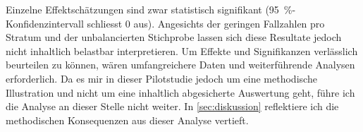 Einzelne Effektschätzungen sind zwar statistisch signifikant (95~\%-Konfidenzintervall schliesst 0 aus). Angesichts der geringen Fallzahlen pro Stratum und der unbalancierten Stichprobe lassen sich diese Resultate jedoch nicht inhaltlich belastbar interpretieren. Um Effekte und Signifikanzen verlässlich beurteilen zu können, wären umfangreichere Daten und weiterführende Analysen erforderlich. Da es mir in dieser Pilotstudie jedoch um eine methodische Illustration und nicht um eine inhaltlich abgesicherte Auswertung geht, führe ich die Analyse an dieser Stelle nicht weiter. In \cref{sec:diskussion} reflektiere ich die methodischen Konsequenzen aus dieser Analyse vertieft.

